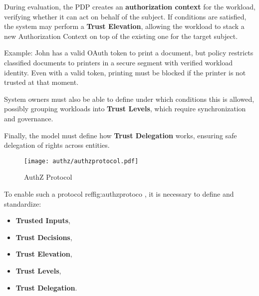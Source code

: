 \vspace{0.5em}  
During evaluation, the PDP creates an \textbf{authorization context} for the workload, verifying whether it can act on behalf of the subject.
If conditions are satisfied, the system may perform a \textbf{Trust Elevation}, allowing the workload to stack a new Authorization Context on top of the existing one for the target subject.

\begin{boxF}
Example: John has a valid OAuth token to print a document, 
but policy restricts classified documents to printers in a secure segment with verified workload identity.  
Even with a valid token, printing must be blocked if the printer is not trusted at that moment.
\end{boxF}

\vspace{0.5em}  
System owners must also be able to define under which conditions this is allowed, possibly grouping workloads into \textbf{Trust Levels}, which require synchronization and governance.  

\vspace{0.5em}  
Finally, the model must define how \textbf{Trust Delegation} works, 
ensuring safe delegation of rights across entities.

\begin{figure}[htbp]
    \centering
    \texttt{[image: authz/authzprotocol.pdf]}
    \caption{AuthZ Protocol}
    \label{fig:authzprotocol}
\end{figure}

\vspace{0.5em}  
To enable such a protocol ref{fig:authzprotoco} , it is necessary to define and standardize:
\begin{itemize}
    \item \textbf{Trusted Inputs},
    \item \textbf{Trust Decisions},
    \item \textbf{Trust Elevation},
    \item \textbf{Trust Levels},
    \item \textbf{Trust Delegation}.
\end{itemize}
